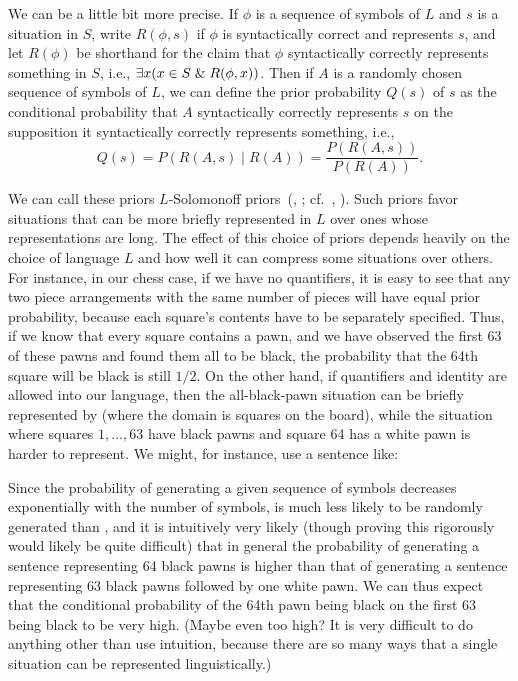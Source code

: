We can be a little bit more precise. If $\phi$ is a sequence of symbols of $L$ and $s$ is a situation in $S$, write
$R(\phi,s)$ if $\phi$ is syntactically correct and represents $s$, and let $R(\phi)$ be shorthand for the claim that $\phi$ syntactically
correctly represents something in $S$, i.e., $\exists x(x\in S\mathrel{\&} R(\phi,x))$. Then if $A$ is a randomly chosen sequence of symbols of $L$,
we can define the prior probability $Q(s)$ of $s$ as the conditional probability that $A$ syntactically correctly represents $s$ on the supposition
it syntactically correctly represents something, i.e.,
$$
    Q(s) = P(R(A,s)\mid R(A)) = \frac{P(R(A,s))}{P(R(A))}.
$$    

We can call these priors $L$-Solomonoff priors~(\citeauthor{PrussRegularityForward}, \citeyear{PrussRegularityForward};
cf.\ \citeauthor{Solomonoff78}, \citeyear{Solomonoff78}).
Such priors favor situations that can be more briefly represented in $L$ over ones whose representations are long.
The effect of this choice of priors depends heavily on the choice of language $L$ and how well it can compress some situations over
others. For instance, in our chess case, if we have no quantifiers, it is easy to see that any two piece arrangements with 
the same number of pieces will have equal prior probability, because each square's contents have to be separately specified. 
Thus, if we know that every square contains a pawn, and we have observed the first 63 of these pawns and found them all to be black, the 
probability that the 64th square will be black is still $1/2$. On the other hand, if quantifiers and identity are allowed into our
language, then the all-black-pawn situation can be briefly represented by
(where the domain is
squares on the board), while the situation where squares $1,...,63$ have black pawns and square 64 has a white pawn is harder
to represent. We might, for instance, use a sentence like:

Since the probability of generating a given sequence of symbols decreases exponentially with the number of symbols, 
is much less likely to be randomly generated than , and it is intuitively very likely (though proving this rigorously would likely be quite difficult) that in general the probability of generating a sentence representing 64 black pawns is higher than that of 
generating a sentence representing 63 black pawns followed by one white pawn. We can thus expect that the conditional probability of
the 64th pawn being black on the first 63 being black to be very high. (Maybe even too high? It is very difficult to 
do anything other than use intuition, because there are so many ways that a single situation can be 
represented linguistically.)

